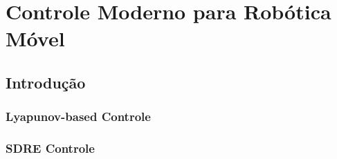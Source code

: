 \chapter{Controle Moderno para Robótica Móvel}


\section{Introdução}\label{intro}

\subsection{Lyapunov-based Controle}
\subsection{SDRE Controle}





